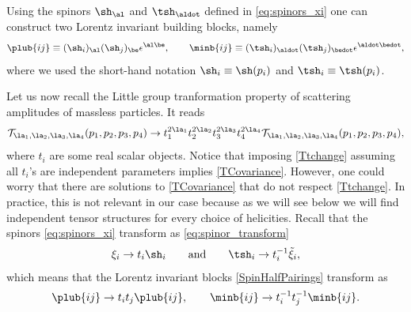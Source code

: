 
Using the spinors $\sh_\al$ and $\tsh_{\aldot}$ defined in \eqref{eq:spinors_xi} one can construct two Lorentz invariant building blocks, namely
\begin{equation}
	\plub{ij}\equiv (\sh_i)_\al(\sh_j)_\be \epsilon^{\al\be}, \qquad
\minb{ij}\equiv (\tsh_i)_{\aldot}(\tsh_j)_{\bedot} \epsilon^{\aldot\bedot},
	\label{SpinHalfPairings}
\end{equation}
where we used the short-hand notation $ \sh_i \equiv \sh(p_i)$ and $\tsh_i\equiv \tsh(p_i)$.

Let us now recall the Little group tranformation property of scattering amplitudes of massless particles. It reads 
\begin{equation}
	\mathcal{T}_{\la_1,\la_2,\la_3,\la_4}(p_1,p_2,p_3,p_4) \to t_1^{2\la_1}t_2^{2\la_2}t_3^{2\la_3}t_4^{2\la_4}
	\mathcal{T}_{\la_1,\la_2,\la_3,\la_4}(p_1,p_2,p_3,p_4),
	\label{Ttchange}
\end{equation}
where $t_i$ are some real scalar objects. 
Notice that imposing \eqref{Ttchange} assuming all $t_i$'s are independent parameters implies \eqref{TCovariance}. However, one could worry that there are solutions to \eqref{TCovariance} that do not respect  \eqref{Ttchange}.
In practice, this is not relevant in our case because as we will see below we will find independent tensor structures for every choice of helicities.
Recall that the spinors \eqref{eq:spinors_xi} transform as \eqref{eq:spinor_transform}
\begin{equation}
	\xi_i \rightarrow t_i \sh_i \qquad\text{and}\qquad \tsh_i \rightarrow t_i^{-1} \tilde \xi_i ,
	\label{lambdatchange}
\end{equation}
which means that the Lorentz invariant blocks \eqref{SpinHalfPairings} transform as 
\begin{equation}
	\label{eq:transformation_bl}
	\plub{ij} \to t_i t_j \plub{ij}, \qquad
	\minb{ij} \to t_i^{-1} t_j^{-1}\minb{ij}.
\end{equation}

